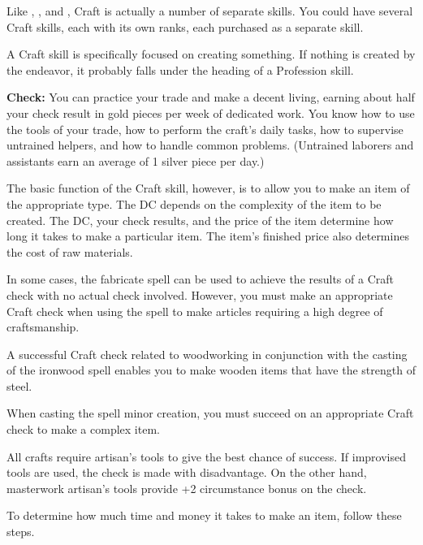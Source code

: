 Like , , and , Craft is actually a number of separate skills. You could have several Craft skills, each with its own ranks, each purchased as a separate skill.

A Craft skill is specifically focused on creating something. If nothing is created by the endeavor, it probably falls under the heading of a Profession skill.

\textbf{Check:} You can practice your trade and make a decent living, earning about half your check result in gold pieces per week of dedicated work. You know how to use the tools of your trade, how to perform the craft's daily tasks, how to supervise untrained helpers, and how to handle common problems. (Untrained laborers and assistants earn an average of 1 silver piece per day.)

The basic function of the Craft skill, however, is to allow you to make an item of the appropriate type. The DC depends on the complexity of the item to be created. The DC, your check results, and the price of the item determine how long it takes to make a particular item. The item's finished price also determines the cost of raw materials.

In some cases, the fabricate spell can be used to achieve the results of a Craft check with no actual check involved. However, you must make an appropriate Craft check when using the spell to make articles requiring a high degree of craftsmanship.

A successful Craft check related to woodworking in conjunction with the casting of the ironwood spell enables you to make wooden items that have the strength of steel.

When casting the spell minor creation, you must succeed on an appropriate Craft check to make a complex item.

All crafts require artisan's tools to give the best chance of success. If improvised tools are used, the check is made with disadvantage. On the other hand, masterwork artisan's tools provide +2 circumstance bonus on the check.

To determine how much time and money it takes to make an item, follow these steps.

